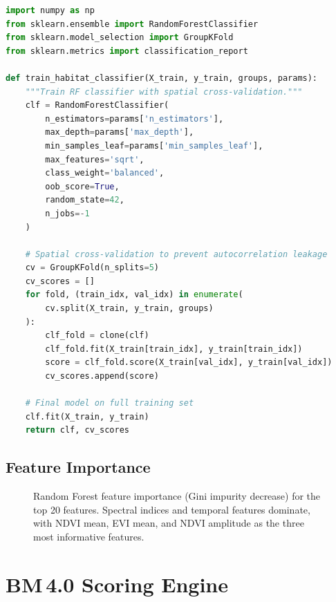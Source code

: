 \begin{lstlisting}[language=Python,caption={Random Forest classifier training pipeline.},label={lst:rf-train}]
import numpy as np
from sklearn.ensemble import RandomForestClassifier
from sklearn.model_selection import GroupKFold
from sklearn.metrics import classification_report

def train_habitat_classifier(X_train, y_train, groups, params):
    """Train RF classifier with spatial cross-validation."""
    clf = RandomForestClassifier(
        n_estimators=params['n_estimators'],
        max_depth=params['max_depth'],
        min_samples_leaf=params['min_samples_leaf'],
        max_features='sqrt',
        class_weight='balanced',
        oob_score=True,
        random_state=42,
        n_jobs=-1
    )

    # Spatial cross-validation to prevent autocorrelation leakage
    cv = GroupKFold(n_splits=5)
    cv_scores = []
    for fold, (train_idx, val_idx) in enumerate(
        cv.split(X_train, y_train, groups)
    ):
        clf_fold = clone(clf)
        clf_fold.fit(X_train[train_idx], y_train[train_idx])
        score = clf_fold.score(X_train[val_idx], y_train[val_idx])
        cv_scores.append(score)

    # Final model on full training set
    clf.fit(X_train, y_train)
    return clf, cv_scores
\end{lstlisting}

\subsection{Feature Importance}

\begin{figure}[H]
\centering
{}
\caption{Random Forest feature importance (Gini impurity decrease) for the top 20 features. Spectral indices and temporal features dominate, with NDVI mean, EVI mean, and NDVI amplitude as the three most informative features.}
\label{fig:feature-importance}
\end{figure}


\section{BM\,4.0 Scoring Engine}

